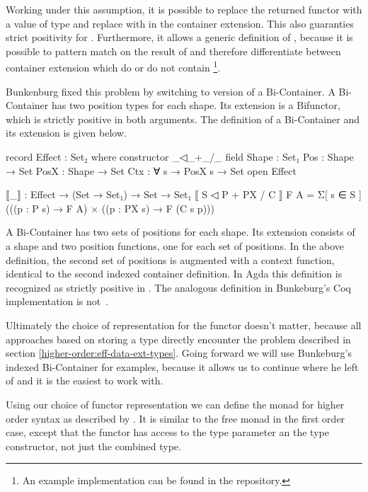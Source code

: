 Working under this assumption, it is possible to replace the returned functor
with a value of type \AgdaSpace{} and
replace  with  in the
container extension.
This also guaranties strict positivity for .
Furthermore, it allows a generic definition of \AgdaFunction{>>=}, because it is
possible to pattern match on the result of  and therefore
differentiate between container extension which do or do not contain
\footnote{An example implementation can be found in the
  repository.}.
 
Bunkenburg fixed this problem by switching to version of a Bi-Container.
A Bi-Container has two position types for each shape.
Its extension is a Bifunctor, which is strictly positive in both arguments.
The definition of a Bi-Container and its extension is given below.

\begin{code}
record Effect : Set₂ where
  constructor _◁_+_/_
  field
    Shape : Set₁
    Pos : Shape → Set
    PosX : Shape → Set
    Ctx : ∀ s → PosX s → Set
open Effect

⟦_⟧ : Effect → (Set → Set₁) → Set → Set₁
⟦ S ◁ P + PX / C ⟧ F A = Σ[ s ∈ S ] (((p : P s) → F A) × ((p : PX s) → F (C s p)))
\end{code}
A Bi-Container has two sets of positions for each shape.
Its extension consists of a shape and two position functions, one for each set
of positions.
In the above definition, the second set of positions is augmented with a context
function, identical to the second indexed container definition.
In Agda this definition is recognized as strictly positive in .
The analogous definition in Bunkeburg's Coq
implementation is not~\cite{bunkenburg2019modeling}.
 
Ultimately the choice of representation for the functor doesn't matter, because
all approaches based on storing a type directly encounter the problem described
in section \ref{higher-order:eff-data-ext-types}.
Going forward we will use Bunkeburg's indexed Bi-Container for examples, because
it allows us to continue where he left of and it is the easiest to work with.
 
Using our choice of functor representation we can define the 
monad for higher order syntax as described by
\textcite{DBLP:conf/haskell/WuSH14}.
It is similar to the free monad in the first order case, except that the functor
has access to the type parameter an the type constructor, not just the
combined type.

